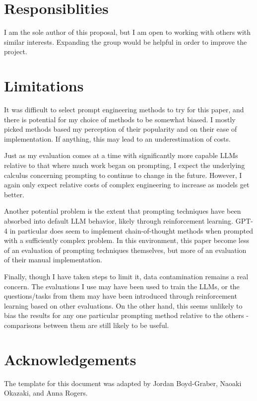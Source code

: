\documentclass[11pt]{article}
\begin{document}
\section*{Responsiblities}

I am the sole author of this proposal, but I am open to working with others with similar interests. Expanding the group would be helpful in order to improve the project.

\section*{Limitations}

It was difficult to select prompt engineering methods to try for this paper, and there is potential for my choice of methods to be somewhat biased. I mostly picked methods based my perception of their popularity and on their ease of implementation. If anything, this may lead to an underestimation of costs.

Just as my evaluation comes at a time with significantly more capable LLMs relative to that where much work began on prompting, I expect the underlying calculus concerning prompting to continue to change in the future. However, I again only expect relative costs of complex engineering to increase as models get better.

Another potential problem is the extent that prompting techniques have been absorbed into default LLM behavior, likely through reinforcement learning. GPT-4 in particular does seem to implement chain-of-thought methods when prompted with a sufficiently complex problem. In this environment, this paper become less of an evaluation of prompting techniques themselves, but more of an evaluation of their manual implementation.

Finally, though I have taken steps to limit it, data contamination remains a real concern. The evaluations I use may have been used to train the LLMs, or the questions/tasks from them may have been introduced through reinforcement learning based on other evaluations. On the other hand, this seems unlikely to bias the results for any one particular prompting method relative to the others - comparisons between them are still likely to be useful.

\section*{Acknowledgements}
The template for this document was adapted by Jordan Boyd-Graber, Naoaki Okazaki, and Anna Rogers.



\end{document}

